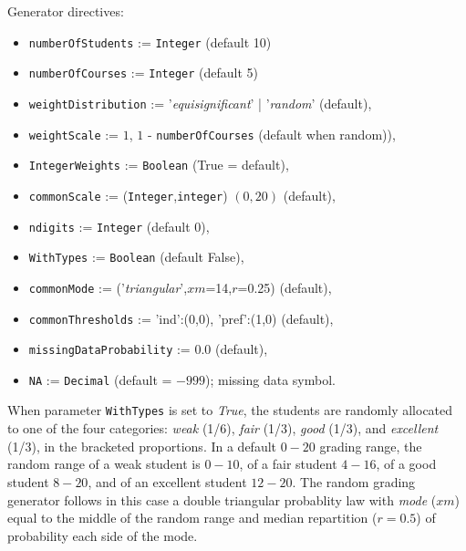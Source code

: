 \noindent Generator directives:
\begin{itemize}
\item \texttt{numberOfStudents} := \texttt{Integer} (default 10)
\item \texttt{numberOfCourses} := \texttt{Integer} (default 5)
\item \texttt{weightDistribution} := '\emph{equisignificant}' | '\emph{random}' (default),
\item \texttt{weightScale} := $1$, $1$ - \texttt{numberOfCourses} (default when random)),
\item \texttt{IntegerWeights} := \texttt{Boolean} (True = default),
\item \texttt{commonScale} := (\texttt{Integer},\texttt{integer}) $(0,20)$ (default),
\item \texttt{ndigits} := \texttt{Integer} (default 0),
\item \texttt{WithTypes} := \texttt{Boolean} (default False),
\item \texttt{commonMode} := ('\emph{triangular}',$xm$=14,$r$=0.25) (default),
\item \texttt{commonThresholds} := {'ind':(0,0), 'pref':(1,0)} (default),
\item \texttt{missingDataProbability} := 0.0 (default),
\item \texttt{NA} := \texttt{Decimal} (default = $-999$); missing data symbol. 
\end{itemize}      

When parameter \texttt{WithTypes} is set to \emph{True}, the students are randomly allocated to one of the four categories: \emph{weak} (1/6), \emph{fair} (1/3), \emph{good} (1/3), and \emph{excellent} (1/3), in the bracketed proportions. In a default $0-20$ grading range, the random range of a weak student is $0-10$, of a fair student $4-16$, of a good student $8-20$, and of an excellent student $12-20$. The random grading generator follows in this case a double triangular probablity law with \emph{mode} ($xm$) equal to the middle of the random range and median repartition ($r = 0.5$) of probability each side of the mode.

